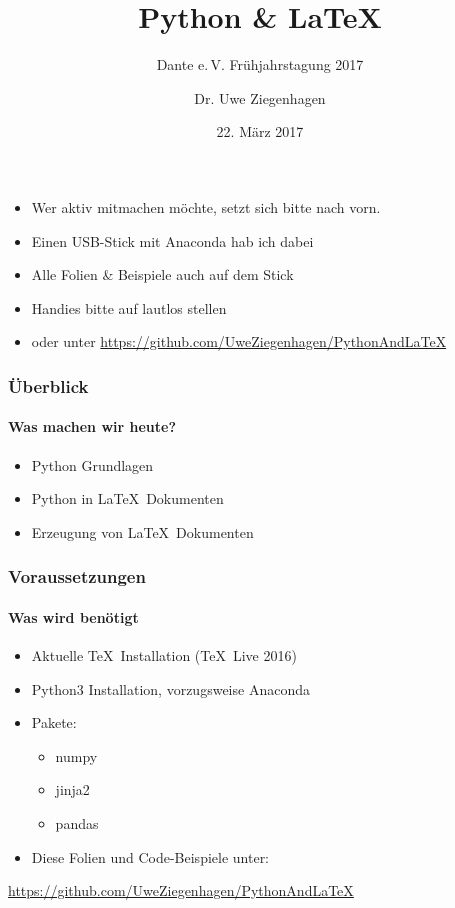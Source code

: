\documentclass[12pt,ngerman]{beamer}
\author{Dr. Uwe Ziegenhagen}
\title{Python \& \LaTeX}
\subtitle{Dante e.\,V. Frühjahrstagung 2017}
\date{22. März 2017}
\begin{document}
\begin{frame}

\begin{itemize}
	\item Wer aktiv mitmachen möchte, setzt sich bitte nach vorn.
	\item Einen USB-Stick mit Anaconda hab ich dabei
	\item Alle Folien \& Beispiele auch auf dem Stick
	\item Handies bitte auf lautlos stellen
	\item oder unter \url{https://github.com/UweZiegenhagen/PythonAndLaTeX}
	\end{itemize}
\end{frame}

\begin{frame}

\maketitle

\end{frame}


\begin{frame}
\frametitle{Überblick}
\framesubtitle{Was machen wir heute?}

\begin{itemize}
\item Python Grundlagen
\item Python in \LaTeX\ Dokumenten
\item Erzeugung von \LaTeX\ Dokumenten
\end{itemize}
\end{frame}


\begin{frame}
\frametitle{Voraussetzungen}
\framesubtitle{Was wird benötigt}

\begin{itemize}
\item Aktuelle \TeX\ Installation (\TeX~Live 2016)
\item Python3 Installation, vorzugsweise Anaconda
\item Pakete:
\begin{itemize}
	\item numpy
	\item jinja2
	\item pandas
\end{itemize}
\item Diese Folien und Code-Beispiele unter: 
\end{itemize}

\url{https://github.com/UweZiegenhagen/PythonAndLaTeX}

\end{frame}
\end{document}
